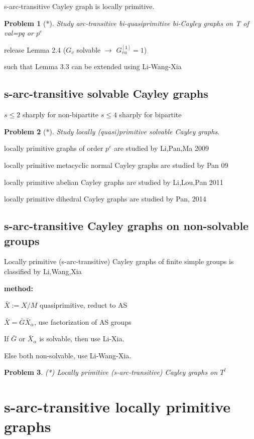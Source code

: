 \documentclass[a4paper,11pt,openany]{book}
\newtheorem{problem}{Problem}[section]
\begin{document}
s-arc-transitive Cayley graph is locally primitive.

\begin{problem}[*]
	Study arc-transitive bi-quasiprimitive bi-Cayley graphs on T of val=pq or $p^e$
\end{problem}

release Lemma 2.4 ($G_v$ solvable $\rightarrow$ $G_{vu}^{[1]}=1$)

such that Lemma 3.3 can be extended using Li-Wang-Xia


\subsection{s-arc-transitive solvable Cayley graphs}
$s\leq 2$ sharply for non-bipartite
$s\leq 4$ sharply for bipartite
\begin{problem}[*]
	Study locally (quasi)primitive solvable Cayley graphs.
\end{problem}

locally primitive graphs of order $p^e$ are studied by Li,Pan,Ma 2009

locally primitive metacyclic normal Cayley graphs are studied by Pan 09

locally primitive abelian Cayley graphs are studied by Li,Lou,Pan 2011

locally primitive dihedral Cayley graphs are studied by Pan, 2014


\subsection{s-arc-transitive Cayley graphs on non-solvable groups}
Locally primitive (s-arc-transitive) Cayley graphs of finite simple groups is classified by Li,Wang,Xia

\textbf{method:}

$\bar{X}:=X/M$ quasiprimitive, reduct to AS

$\bar{X}=\bar{G} \bar{X}_\alpha$, use factorization of AS groups

If $\bar{G}$ or $\bar{X}_\alpha$ is solvable, then use Li-Xia. 

Else both non-solvable, use Li-Wang-Xia. 

\begin{problem}(*)
	Locally primitive (s-arc-transitive) Cayley graphs on $T^l$
\end{problem}

\section{s-arc-transitive locally primitive graphs}
\end{document}
